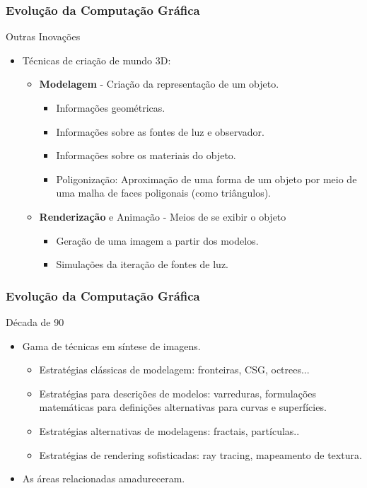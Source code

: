 \documentclass{beamer}
\begin{document}
\begin{frame}
\frametitle{Evolução da Computação Gráfica}

\begin{block}{Outras Inovações}

	\begin{itemize}
		\item<1-> Técnicas de criação de mundo 3D:
		\begin{itemize}
			\item \textbf{Modelagem} - Criação da representação de um objeto.
				\begin{itemize}
					\item Informações geométricas.
					\item Informações sobre as fontes de luz e observador.
					\item Informações sobre os materiais do objeto.
					\item Poligonização: Aproximação de uma forma de um objeto por meio de uma malha de faces poligonais (como triângulos). 
				\end{itemize}
			\item \textbf{Renderização} e Animação - Meios de se exibir o objeto 
				\begin{itemize}
					\item Geração de uma imagem a partir dos modelos.
					\item Simulações da iteração de fontes de luz.
				\end{itemize}
			
		\end{itemize}
	\end{itemize}
\end{block}

\end{frame}




\begin{frame}
\frametitle{Evolução da Computação Gráfica}

\begin{block}{Década de 90}
		\begin{itemize}
			\item Gama de técnicas em síntese de imagens.
				\begin{itemize}
					\item Estratégias clássicas de modelagem: fronteiras, CSG, octrees...
					\item Estratégias para descrições de modelos: varreduras, formulações matemáticas para definições alternativas para curvas e superfícies.
					\item Estratégias alternativas de modelagens: fractais, partículas..
					\item Estratégias de rendering sofisticadas: ray tracing, mapeamento de textura. 
				\end{itemize}
			\item As áreas relacionadas amadureceram.
			
		\end{itemize}
\end{block}

\end{frame}
\end{document}
